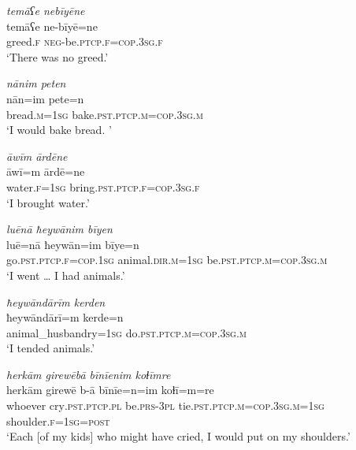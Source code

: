 \ea \label{ŽE.58}
\textit{temāʕe nebīyēne} \\ 
\gll temāʕe ne-bīyē=ne \\ 
 greed\textsc{.f} \textsc{neg-}be\textsc{.ptcp}\textsc{.f}\textsc{=cop}\textsc{.3sg}\textsc{.f} \\ 
\glt `There was no greed.'
\z 
 
\ea \label{ŽE.60}
\textit{nānim peten} \\ 
\gll nān=im pete=n \\ 
 bread\textsc{.m}\textsc{=\textsc{1sg}} bake\textsc{.pst}\textsc{.ptcp}\textsc{.m}\textsc{=cop}\textsc{.3sg}\textsc{.m} \\ 
\glt `I would bake bread. '
\z 
 
\ea \label{ŽE.61}
\textit{āwīm ārdēne} \\ 
\gll āwī=m ārdē=ne \\ 
 water\textsc{.f}\textsc{=\textsc{1sg}} bring\textsc{.pst}\textsc{.ptcp}\textsc{.f}\textsc{=cop}\textsc{.3sg}\textsc{.f} \\ 
\glt `I brought water.'
\z 
 
\ea \label{ŽE.62}
\textit{luēnā ħeywānim bīyen} \\ 
\gll luē=nā ħeywān=im bīye=n \\ 
 go\textsc{.pst}\textsc{.ptcp}\textsc{.f}\textsc{=cop}\textsc{.\textsc{1sg}} animal\textsc{.dir}\textsc{.m}\textsc{=\textsc{1sg}} be\textsc{.pst}\textsc{.ptcp}\textsc{.m}\textsc{=cop}\textsc{.3sg}\textsc{.m} \\ 
\glt `I went … I had animals.'
\z 
 
\ea \label{ŽE.63}
\textit{ħeywāndārīm kerden} \\ 
\gll ħeywāndārī=m kerde=n \\ 
 animal\_husbandry\textsc{=\textsc{1sg}} do\textsc{.pst}\textsc{.ptcp}\textsc{.m}\textsc{=cop}\textsc{.3sg}\textsc{.m} \\ 
\glt `I tended animals.'
\z 
 
\ea \label{ŽE.64}
\textit{herkām girewēbā bīnīenim koɫīmre} \\ 
\gll herkām girewē b-ā bīnīe=n=im koɫī=m=re \\ 
 whoever cry\textsc{.pst}\textsc{.ptcp}\textsc{.pl} be\textsc{.prs}\textsc{-3pl} tie\textsc{.pst}\textsc{.ptcp}\textsc{.m}\textsc{=cop}\textsc{.3sg}\textsc{.m}\textsc{=\textsc{1sg}} shoulder\textsc{.f}\textsc{=\textsc{1sg}}\textsc{=\textsc{post}} \\ 
\glt `Each [of my kids] who might have cried, I would put on my shoulders.'
\z 
 
